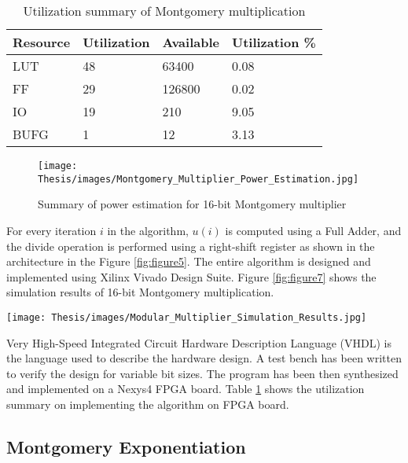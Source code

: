 \documentclass{cpp}
\begin{document}
\begin{table}[h]
\centering
\caption{Utilization summary of Montgomery multiplication}
\begin{tabular}{llll}
\hline
Resource &
Utilization &
Available &
Utilization \% \\
\hline
LUT &
48 &
63400 &
0.08 \\
FF &
29 &
126800 &
0.02 \\
IO &
19 &
210 &
9.05 \\
BUFG &
1 &
12 &
3.13 \\
\hline
\end{tabular}
\label{table:table1}
\end{table}

\begin{figure}[htp]
    \centering
    \texttt{[image: Thesis/images/Montgomery\_Multiplier\_Power\_Estimation.jpg]}
    \caption{Summary of power estimation for 16-bit Montgomery multiplier}
    \label{fig:figure6}
\end{figure}

For every iteration $i$ in the algorithm, $u(i)$ is computed using a Full Adder, and the divide operation is performed using a right-shift register as shown in the architecture in the Figure \ref{fig:figure5}. The entire algorithm is designed and implemented using Xilinx Vivado Design Suite. Figure \ref{fig:figure7} shows the simulation results of 16-bit Montgomery multiplication.

\begin{figure*}[htp]
    \centering
    \texttt{[image: Thesis/images/Modular\_Multiplier\_Simulation\_Results.jpg]}
    \caption{Simulation results of Montgomery multiplier from Xilinx Vivado Design Suite}
    \label{fig:figure7}
\end{figure*}

Very High-Speed Integrated Circuit Hardware Description Language (VHDL) is the language used to describe the hardware design. A test bench has been written to verify the design for variable bit sizes. The program has been then synthesized and implemented on a Nexys4 FPGA board. Table \ref{table:table1} shows the utilization summary on implementing the algorithm on FPGA board.

\newpage

\subsection{Montgomery Exponentiation}
\end{document}
